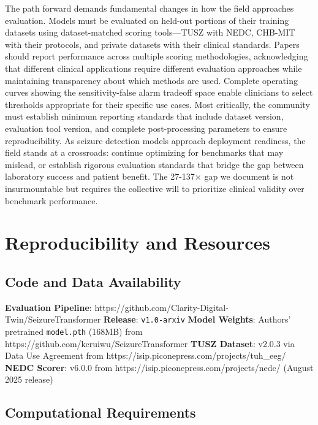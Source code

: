 \documentclass[
  10pt,
]{article}
\begin{document}
The path forward demands fundamental changes in how the field approaches
evaluation. Models must be evaluated on held-out portions of their
training datasets using dataset-matched scoring tools---TUSZ with NEDC,
CHB-MIT with their protocols, and private datasets with their clinical
standards. Papers should report performance across multiple scoring
methodologies, acknowledging that different clinical applications
require different evaluation approaches while maintaining transparency
about which methods are used. Complete operating curves showing the
sensitivity-false alarm tradeoff space enable clinicians to select
thresholds appropriate for their specific use cases. Most critically,
the community must establish minimum reporting standards that include
dataset version, evaluation tool version, and complete post-processing
parameters to ensure reproducibility. As seizure detection models
approach deployment readiness, the field stands at a crossroads:
continue optimizing for benchmarks that may mislead, or establish
rigorous evaluation standards that bridge the gap between laboratory
success and patient benefit. The 27-137× gap we document is not
insurmountable but requires the collective will to prioritize clinical
validity over benchmark performance.



\hypertarget{reproducibility-and-resources}{%
\section{Reproducibility and
Resources}\label{reproducibility-and-resources}}

\hypertarget{code-and-data-availability}{%
\subsection{Code and Data
Availability}\label{code-and-data-availability}}

\textbf{Evaluation Pipeline}:
https://github.com/Clarity-Digital-Twin/SeizureTransformer
\textbf{Release}: \texttt{v1.0-arxiv} \textbf{Model Weights}: Authors'
pretrained \texttt{model.pth} (168MB) from
https://github.com/keruiwu/SeizureTransformer \textbf{TUSZ Dataset}:
v2.0.3 via Data Use Agreement from
https://isip.piconepress.com/projects/tuh\_eeg/ \textbf{NEDC Scorer}:
v6.0.0 from https://isip.piconepress.com/projects/nedc/ (August 2025
release)

\hypertarget{computational-requirements}{%
\subsection{Computational
Requirements}\label{computational-requirements}}
\end{document}
